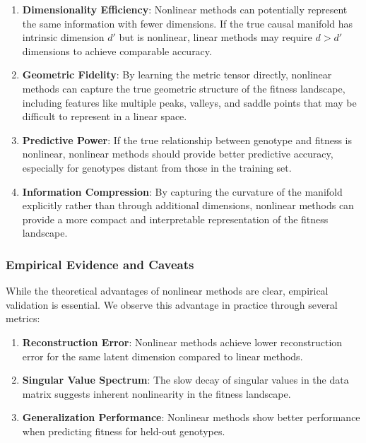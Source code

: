 \documentclass[
]{scrartcl}
\begin{document}
\begin{refsection}
\begin{enumerate}
\def\labelenumi{\arabic{enumi}.}
\item
  \textbf{Dimensionality Efficiency}: Nonlinear methods can potentially
  represent the same information with fewer dimensions. If the true
  causal manifold has intrinsic dimension \(d'\) but is nonlinear,
  linear methods may require \(d > d'\) dimensions to achieve comparable
  accuracy.
\item
  \textbf{Geometric Fidelity}: By learning the metric tensor directly,
  nonlinear methods can capture the true geometric structure of the
  fitness landscape, including features like multiple peaks, valleys,
  and saddle points that may be difficult to represent in a linear
  space.
\item
  \textbf{Predictive Power}: If the true relationship between genotype
  and fitness is nonlinear, nonlinear methods should provide better
  predictive accuracy, especially for genotypes distant from those in
  the training set.
\item
  \textbf{Information Compression}: By capturing the curvature of the
  manifold explicitly rather than through additional dimensions,
  nonlinear methods can provide a more compact and interpretable
  representation of the fitness landscape.
\end{enumerate}

\subsubsection{Empirical Evidence and
Caveats}\label{empirical-evidence-and-caveats}

While the theoretical advantages of nonlinear methods are clear,
empirical validation is essential. We observe this advantage in practice
through several metrics:

\begin{enumerate}
\def\labelenumi{\arabic{enumi}.}
\item
  \textbf{Reconstruction Error}: Nonlinear methods achieve lower
  reconstruction error for the same latent dimension compared to linear
  methods.
\item
  \textbf{Singular Value Spectrum}: The slow decay of singular values in
  the data matrix suggests inherent nonlinearity in the fitness
  landscape.
\item
  \textbf{Generalization Performance}: Nonlinear methods show better
  performance when predicting fitness for held-out genotypes.
\end{enumerate}


\end{refsection}
\end{document}

